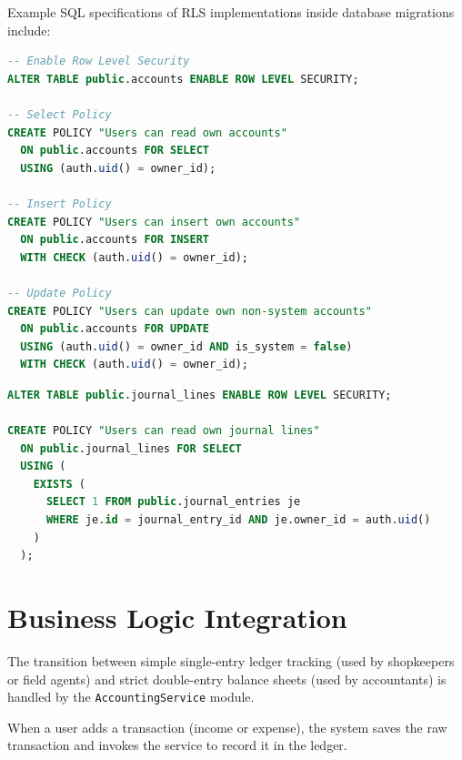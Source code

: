 \documentclass[journal, a4paper, onecolumn, 12pt]{IEEEtran}
\begin{document}
Example SQL specifications of RLS implementations inside database migrations include:

\begin{lstlisting}[language=SQL, caption=SQL Migration excerpt for Accounts RLS policies]
-- Enable Row Level Security
ALTER TABLE public.accounts ENABLE ROW LEVEL SECURITY;

-- Select Policy
CREATE POLICY "Users can read own accounts" 
  ON public.accounts FOR SELECT
  USING (auth.uid() = owner_id);

-- Insert Policy
CREATE POLICY "Users can insert own accounts" 
  ON public.accounts FOR INSERT
  WITH CHECK (auth.uid() = owner_id);

-- Update Policy
CREATE POLICY "Users can update own non-system accounts" 
  ON public.accounts FOR UPDATE
  USING (auth.uid() = owner_id AND is_system = false)
  WITH CHECK (auth.uid() = owner_id);
\end{lstlisting}

\begin{lstlisting}[language=SQL, caption=Nested relation checks in Journal Lines policies]
ALTER TABLE public.journal_lines ENABLE ROW LEVEL SECURITY;

CREATE POLICY "Users can read own journal lines"
  ON public.journal_lines FOR SELECT
  USING (
    EXISTS (
      SELECT 1 FROM public.journal_entries je
      WHERE je.id = journal_entry_id AND je.owner_id = auth.uid()
    )
  );
\end{lstlisting}

\section{Business Logic Integration}
The transition between simple single-entry ledger tracking (used by shopkeepers or field agents) and strict double-entry balance sheets (used by accountants) is handled by the \texttt{AccountingService} module. 

When a user adds a transaction (income or expense), the system saves the raw transaction and invokes the service to record it in the ledger.
\end{document}
